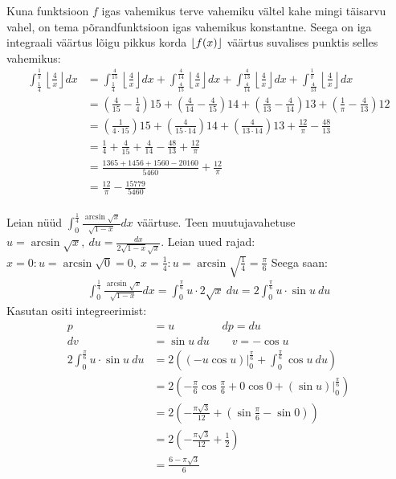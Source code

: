 \documentclass{article}
\DeclarePairedDelimiter\floor{\lfloor}{\rfloor}
\begin{document}
Kuna funktsioon $f$ igas vahemikus terve vahemiku v\"altel kahe mingi t\"aisarvu vahel, on tema p\~orandfunktsioon igas vahemikus konstantne. Seega on iga integraali v\"a\"artus l\~oigu pikkus korda $\floor{f(x)}$ v\"a\"artus suvalises punktis selles vahemikus:
\begin{equation*}
\begin{aligned}
\int_{\frac{1}{4}}^{\frac{1}{\pi}}\left\lfloor{\frac{4}{x}}\right\rfloor dx&=\int_{\frac{1}{4}}^{\frac{4}{15}}\left\lfloor{\frac{4}{x}}\right\rfloor dx+\int_{\frac{4}{15}}^{\frac{4}{14}}\left\lfloor{\frac{4}{x}}\right\rfloor dx+\int_{\frac{4}{14}}^{\frac{4}{13}}\left\lfloor{\frac{4}{x}}\right\rfloor dx+\int_{\frac{4}{13}}^{\frac{1}{\pi}}\left\lfloor{\frac{4}{x}}\right\rfloor dx\\
&=\left(\frac{4}{15}-\frac{1}{4}\right)15+\left(\frac{4}{14}-\frac{4}{15}\right)14+\left(\frac{4}{13}-\frac{4}{14}\right)13+\left(\frac{1}{\pi}-\frac{4}{13}\right)12\\
&=\left(\frac{1}{4\cdot15}\right)15+\left(\frac{4}{15\cdot14}\right)14+\left(\frac{4}{13\cdot14}\right)13+\frac{12}{\pi}-\frac{48}{13}\\
&=\frac{1}{4}+\frac{4}{15}+\frac{4}{14}-\frac{48}{13}+\frac{12}{\pi}\\
&=\frac{1365+1456+1560-20160}{5460}+\frac{12}{\pi}\\
&=\frac{12}{\pi}-\frac{15779}{5460}
\end{aligned}
\end{equation*}
\pagebreak\\
Leian n\"u\"ud $\displaystyle\int_0^{\frac{1}{4}}\frac{\arcsin\sqrt{x}}{\sqrt{1-x}}dx$ v\"a\"artuse. Teen muutujavahetuse $u=\displaystyle\arcsin{\sqrt{x}},\ du=\frac{dx}{2\sqrt{1-x}\sqrt{x}}$. Leian uued rajad: $x=0: u=\arcsin\sqrt0=0,\ x=\frac{1}{4}: u=\arcsin\sqrt{\frac{1}{4}}=\frac{\pi}{6}$ Seega saan:
\begin{equation*}
\begin{aligned}
\int_0^{\frac{1}{4}}\frac{\arcsin\sqrt{x}}{\sqrt{1-x}}dx=\int_0^{\frac{\pi}{6}}u\cdot2\sqrt x\ du=2\int_0^{\frac{\pi}{6}}u\cdot\sin u\ du
\end{aligned}
\end{equation*}
Kasutan ositi integreerimist:
\begin{equation*}
\begin{aligned}
p&=u \qquad\ \qquad dp=du\\
dv&=\sin u\ du\qquad  v=-\cos u\\
2\int_0^{\frac{\pi}{6}}u\cdot\sin u\ du&=2((-u\cos u)\Big|_0^{\frac{\pi}{6}}+\int_0^{\frac{\pi}{6}}\cos u\ du)\\
&=2(-\frac{\pi}{6}\cos \frac{\pi}{6}+0\cos 0+(\sin u)\Big|_0^{\frac{\pi}{6}})\\
&=2(-\frac{\pi\sqrt3}{12}+(\sin \frac{\pi}{6}-\sin 0))\\
&=2(-\frac{\pi\sqrt3}{12}+\frac{1}{2})\\
&=\frac{6-\pi\sqrt3}{6}\\
\end{aligned}
\end{equation*}
\end{document}

